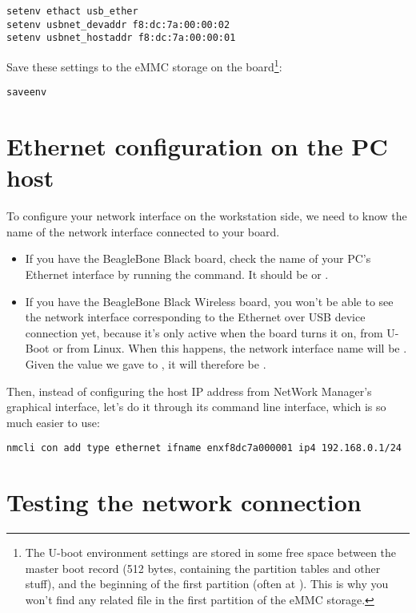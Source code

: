\begin{verbatim}
setenv ethact usb_ether
setenv usbnet_devaddr f8:dc:7a:00:00:02
setenv usbnet_hostaddr f8:dc:7a:00:00:01
\end{verbatim}

Save these settings to the eMMC storage on the board\footnote{
The U-boot environment settings are stored in some free space
between the master boot record (512 bytes, containing the partition
tables and other stuff), and the beginning of the first partition (often
at ). This is why you won't find any related file in the
first partition of the eMMC storage.}:

\begin{verbatim}
saveenv
\end{verbatim}

\section{Ethernet configuration on the PC host}

To configure your network interface on the workstation side, we need
to know the name of the network interface connected to your board.

\begin{itemize}
   \item If you have the BeagleBone Black board, check the name
      of your PC's Ethernet interface by running the 
      command. It should be  or .
   \item If you have the BeagleBone Black Wireless board, you won't
      be able to see the network interface corresponding to the Ethernet
      over USB device connection yet, because it's only active when
      the board turns it on, from U-Boot or from Linux. When this
      happens, the network interface name will be .
      Given the value we gave to , it will
      therefore be .
\end{itemize}

Then, instead of configuring the host IP address from NetWork Manager's
graphical interface, let's do it through its command line interface,
which is so much easier to use:

\begin{verbatim}
nmcli con add type ethernet ifname enxf8dc7a000001 ip4 192.168.0.1/24
\end{verbatim}

\section{Testing the network connection}

